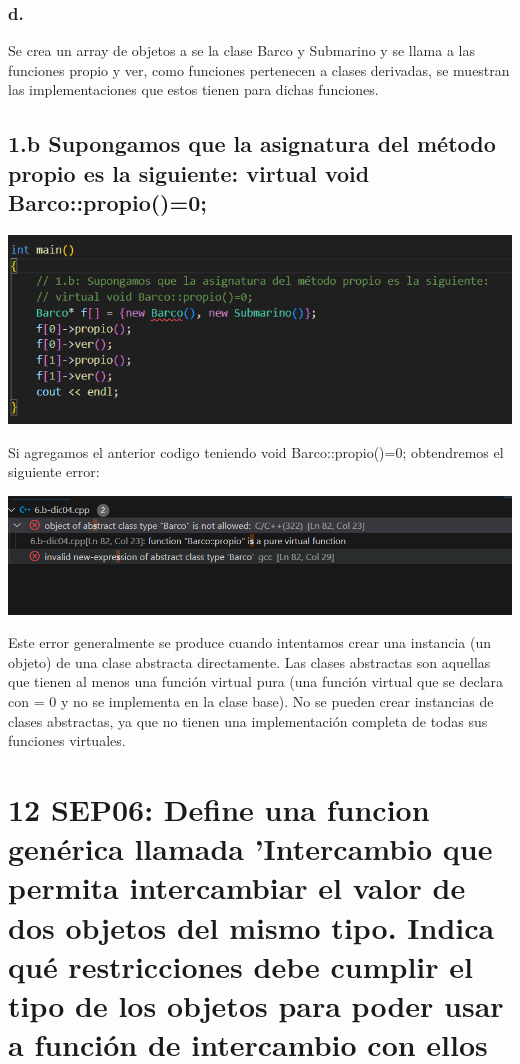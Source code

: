 \documentclass[11pt,a4paper]{article}
\begin{document}
\subsubsection{d. }
Se crea un array de objetos a se la clase Barco y Submarino y se llama a las funciones propio y ver, como funciones pertenecen a clases derivadas, se muestran las implementaciones que estos tienen para dichas funciones.

\subsection{1.b Supongamos que la asignatura del método propio es la siguiente:  virtual void Barco::propio()=0;}

{\includegraphics[width=1\textwidth]{images/2-codigo.png}\par}
Si agregamos el anterior codigo teniendo void Barco::propio()=0; obtendremos el siguiente error:

{\includegraphics[width=1\textwidth]{images/3-error.png}\par}


Este error generalmente se produce cuando intentamos crear una instancia (un objeto) de una clase abstracta directamente. Las clases abstractas son aquellas que tienen al menos una función virtual pura (una función virtual que se declara con = 0 y no se implementa en la clase base). No se pueden crear instancias de clases abstractas, ya que no tienen una implementación completa de todas sus funciones virtuales.






\section{12 SEP06: Define una funcion genérica llamada 'Intercambio que permita intercambiar el valor de dos objetos del mismo tipo. Indica qué restricciones debe cumplir el tipo de los objetos para poder usar a función de intercambio con ellos
}
\end{document}
